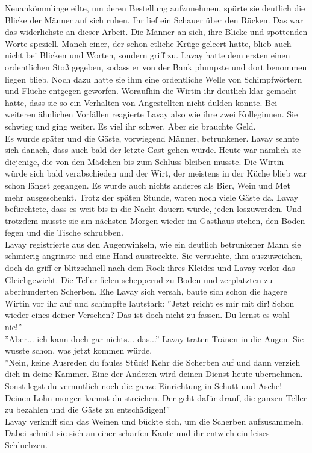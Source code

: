 Neuankömmlinge eilte, um deren Bestellung aufzunehmen, spürte sie deutlich die Blicke der Männer 
auf sich ruhen. Ihr lief ein Schauer über den Rücken. Das war das widerlichste an dieser Arbeit. 
Die Männer an sich, ihre Blicke und spottenden Worte speziell. Manch einer, der schon etliche Krüge 
geleert hatte, blieb auch nicht bei Blicken und Worten, sondern griff zu. Lavay hatte dem ersten 
einen ordentlichen Stoß gegeben, sodass er von der Bank plumpste und dort benommen liegen blieb. 
Noch dazu hatte sie ihm eine ordentliche Welle von Schimpfwörtern und Flüche entgegen geworfen. 
Woraufhin die Wirtin ihr deutlich klar gemacht hatte, dass sie so ein Verhalten von Angestellten 
nicht dulden konnte. Bei weiteren ähnlichen Vorfällen reagierte Lavay also wie ihre zwei 
Kolleginnen. Sie schwieg und ging weiter. Es viel ihr schwer. Aber sie brauchte Geld.\\
Es wurde später und die Gäste, vorwiegend Männer, betrunkener. Lavay sehnte sich danach, dass auch 
bald der letzte Gast gehen würde. Heute war nämlich sie diejenige, die von den Mädchen bis zum 
Schluss bleiben musste. Die Wirtin würde sich bald verabschieden und der Wirt, der meistens in der 
Küche blieb war schon längst gegangen. Es wurde auch nichts anderes als Bier, Wein und Met 
mehr ausgeschenkt. Trotz der späten Stunde, waren noch viele Gäste da. Lavay befürchtete, dass es 
weit bis in die Nacht dauern würde, jeden loszuwerden. Und trotzdem musste sie am nächsten Morgen 
wieder im Gasthaus stehen, den Boden fegen und die Tische schrubben.\\
Lavay registrierte aus den Augenwinkeln, wie ein deutlich betrunkener Mann sie schmierig angrinste 
und eine Hand ausstreckte. Sie versuchte, ihm auszuweichen, doch da griff er blitzschnell nach dem 
Rock ihres Kleides und Lavay verlor das Gleichgewicht. Die Teller fielen scheppernd zu Boden und 
zerplatzten zu aberhunderten Scherben. Ehe Lavay sich versah, baute sich schon die hagere Wirtin 
vor ihr auf und schimpfte lautstark: ''Jetzt reicht es mir mit dir! Schon wieder eines deiner 
Versehen? Das ist doch nicht zu fassen. Du lernst es wohl nie!''\\
''Aber... ich kann doch gar nichts... das...'' Lavay traten Tränen in die Augen. Sie wusste schon, 
was jetzt kommen würde.\\
''Nein, keine Ausreden du faules Stück! Kehr die Scherben auf und dann verzieh dich in deine 
Kammer. Eine der Anderen wird deinen Dienst heute übernehmen. Sonst legst du vermutlich noch die 
ganze Einrichtung in Schutt und Asche! Deinen Lohn morgen kannst du streichen. Der geht dafür 
drauf, die ganzen Teller zu bezahlen und die Gäste zu entschädigen!''\\
Lavay verkniff sich das Weinen und bückte sich, um die Scherben aufzusammeln. Dabei schnitt sie 
sich an einer scharfen Kante und ihr entwich ein leises Schluchzen.\\

